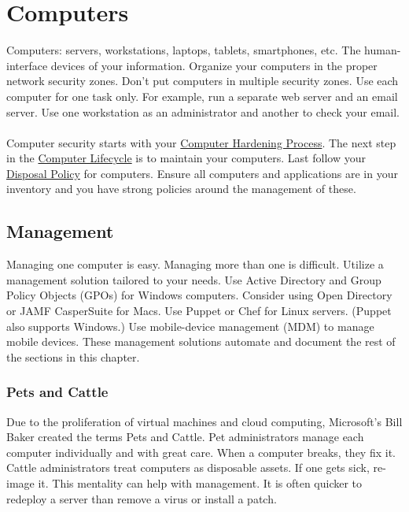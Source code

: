 \section{Computers}\label{sec:"Computers"}
Computers: servers, workstations, laptops, tablets, smartphones, etc. The human-interface devices of your information. Organize your computers in the proper network security zones. Don't put computers in multiple security zones. Use each computer for one task only. For example, run a separate web server and an email server. Use one workstation as an administrator and another to check your email.\\\\
Computer security starts with your  \hyperref[subsec:"Computer Hardening Process"]{Computer Hardening Process}. The next step in the \hyperref[subsubsec:"Computer Lifecycle"]{Computer Lifecycle} is to maintain your computers. Last follow your \hyperref[subsec:"Disposal and Retention"]{Disposal Policy} for computers. Ensure all computers and applications are in your inventory and you have strong policies around the management of these.
\subsection{Management}
Managing one computer is easy. Managing more than one is difficult. Utilize a management solution tailored to your needs. Use Active Directory and Group Policy Objects (GPOs) for Windows computers. Consider using Open Directory or JAMF CasperSuite for Macs. Use Puppet or Chef for Linux servers. (Puppet also supports Windows.) Use mobile-device management (MDM) to manage mobile devices. These management solutions automate and document the rest of the sections in this chapter.
\subsubsection{Pets and Cattle}
Due to the proliferation of virtual machines and cloud computing, Microsoft's Bill Baker created the terms Pets and Cattle. Pet administrators manage each computer individually and with great care. When a computer breaks, they fix it. Cattle administrators treat computers as disposable assets. If one gets sick, re-image it. This mentality can help with management. It is often quicker to redeploy a server than remove a virus or install a patch.
